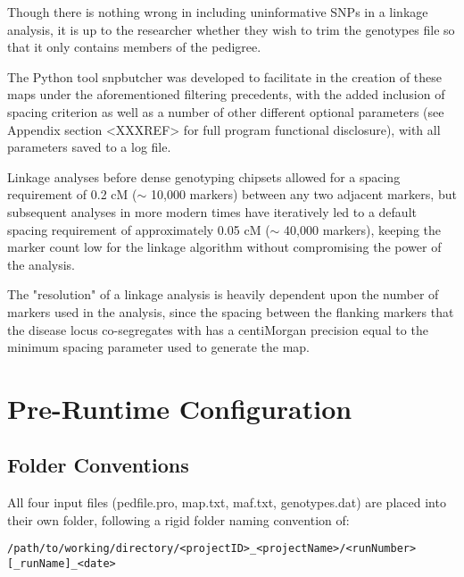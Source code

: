 Though there is nothing wrong in including uninformative SNPs in a linkage analysis, it is up to the researcher whether they wish to trim the genotypes file so that it only contains members of the pedigree.

The Python tool \gls{snpbutcher} was developed to facilitate in the creation of these maps under the aforementioned filtering precedents, with the added inclusion of spacing criterion as well as a number of other different optional parameters (see Appendix section <XXXREF> for full program functional disclosure), with all parameters saved to a log file. 

Linkage analyses before dense genotyping chipsets allowed for a spacing requirement of 0.2 cM ($\sim$ 10,000 markers) between any two adjacent markers, but subsequent analyses in more modern times have iteratively led to a default spacing requirement of approximately 0.05 cM ($\sim$ 40,000 markers), keeping the marker count low for the linkage algorithm without compromising the power of the analysis.

The "resolution" of a linkage analysis is heavily dependent upon the number of markers used in the analysis, since the spacing between the flanking markers that the disease locus co-segregates with has a centiMorgan precision equal to the minimum spacing parameter used to generate the map.



\section{Pre-Runtime Configuration}

\subsection{Folder Conventions}

All four input files (pedfile.pro, map.txt, maf.txt, genotypes.dat) are placed into their own folder, following a rigid folder naming convention of: 

\begin{verbatim}
/path/to/working/directory/<projectID>_<projectName>/<runNumber>[_runName]_<date>
\end{verbatim}

